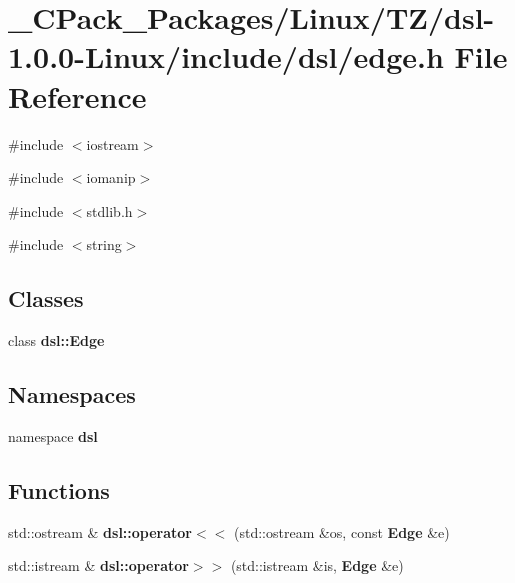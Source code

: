 \section{\_\-CPack\_\-Packages/Linux/TZ/dsl-\/1.0.0-\/Linux/include/dsl/edge.h File Reference}
\label{__CPack__Packages_2Linux_2TZ_2dsl-1_80_80-Linux_2include_2dsl_2edge_8h}
{\ttfamily \#include $<$iostream$>$}\par
{\ttfamily \#include $<$iomanip$>$}\par
{\ttfamily \#include $<$stdlib.h$>$}\par
{\ttfamily \#include $<$string$>$}\par
\subsection*{Classes}
\begin{DoxyCompactItemize}
\item 
class {\bf dsl::Edge}
\end{DoxyCompactItemize}
\subsection*{Namespaces}
\begin{DoxyCompactItemize}
\item 
namespace {\bf dsl}
\end{DoxyCompactItemize}
\subsection*{Functions}
\begin{DoxyCompactItemize}
\item 
std::ostream \& {\bf dsl::operator$<$$<$} (std::ostream \&os, const {\bf Edge} \&e)
\item 
std::istream \& {\bf dsl::operator$>$$>$} (std::istream \&is, {\bf Edge} \&e)
\end{DoxyCompactItemize}
